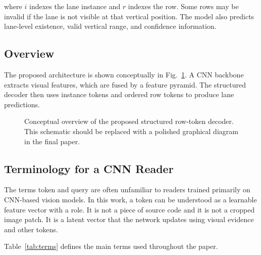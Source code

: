 \documentclass[conference]{IEEEtran}
\begin{document}
where $i$ indexes the lane instance and $r$ indexes the row. Some rows may be invalid if the lane is not visible at that vertical position. The model also predicts lane-level existence, valid vertical range, and confidence information.

\subsection{Overview}

The proposed architecture is shown conceptually in Fig.~\ref{fig:overview}. A CNN backbone extracts visual features, which are fused by a feature pyramid. The structured decoder then uses instance tokens and ordered row tokens to produce lane predictions.

\begin{figure}[t]
\centering
{}
\caption{Conceptual overview of the proposed structured row-token decoder. This schematic should be replaced with a polished graphical diagram in the final paper.}
\label{fig:overview}
\end{figure}

\subsection{Terminology for a CNN Reader}

The terms token and query are often unfamiliar to readers trained primarily on CNN-based vision models. In this work, a token can be understood as a learnable feature vector with a role. It is not a piece of source code and it is not a cropped image patch. It is a latent vector that the network updates using visual evidence and other tokens.

Table~\ref{tab:terms} defines the main terms used throughout the paper.
\end{document}
